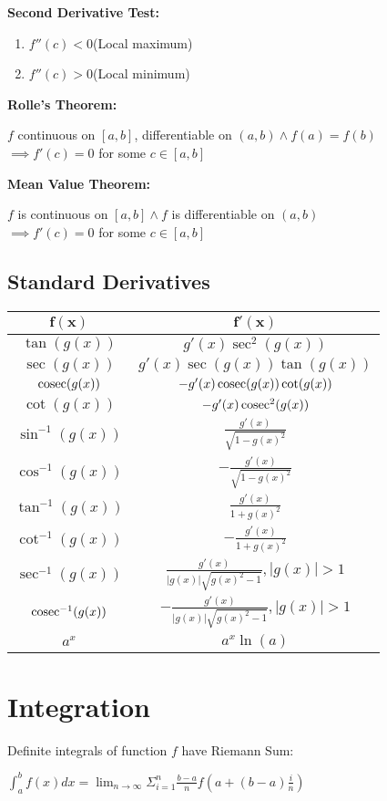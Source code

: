 \documentclass[12pt, a4paper]{article}
\begin{document}
\begin{multicols*}{3}
\textbf{Second Derivative Test:}
\begin{enumerate}[\roman*.]
  \item $f''(c)<0$\hfill(Local maximum)
  \item $f''(c)>0$\hfill(Local minimum)
\end{enumerate}

\textbf{Rolle's Theorem:}\\
{\centering
  $f$ continuous on $[a,b]$, differentiable on $(a,b) \land f(a) = f(b)$\\
  $\implies f'(c) = 0$ for some $c \in [a,b]$
\par}

\textbf{Mean Value Theorem:}\\
{\centering
  $f$ is continuous on $[a,b] \land f$ is differentiable on $(a,b)$\\
  $\implies f'(c) = 0$ for some $c \in [a,b]$
\par}

\subsection{Standard Derivatives}
{\centering
\begin{tabular}{|c|c|}
\hline
$\mathbf{f(x)}$ & $\mathbf{f'(x)}$ \\ \hline
$\tan(g(x))$ & $g'(x)\sec^2(g(x))$ \\ \hline
$\sec(g(x))$ & $g'(x)\sec(g(x))\tan(g(x))$ \\ \hline
$\operatorname{cosec}(g(x))$ & $-g'(x)\operatorname{cosec}(g(x))\cot(g(x))$ \\ \hline
$\cot(g(x))$ & $-g'(x)\operatorname{cosec}^2(g(x))$ \\ \hline
$\sin^{-1}(g(x))$ & $\frac{g'(x)}{\sqrt{1-g(x)^2}}$ \\ \hline
$\cos^{-1}(g(x))$ & $-\frac{g'(x)}{\sqrt{1-g(x)^2}}$ \\ \hline
$\tan^{-1}(g(x))$ & $\frac{g'(x)}{1+g(x)^2}$ \\ \hline
$\cot^{-1}(g(x))$ & $-\frac{g'(x)}{1+g(x)^2}$ \\ \hline
$\sec^{-1}(g(x))$ & $\frac{g'(x)}{|g(x)|\sqrt{g(x)^2 - 1}}, |g(x)|>1$ \\ \hline
$\operatorname{cosec}^{-1}(g(x))$ & $-\frac{g'(x)}{|g(x)|\sqrt{g(x)^2 - 1}}, |g(x)|>1$ \\ \hline
$a^x$ & $a^x\ln(a)$ \\ \hline
\end{tabular}
\par}
\section{Integration}
Definite integrals of function $f$ have Riemann Sum:\\
{\centering
  $\displaystyle \int^b_a f(x)dx = \lim_{n\rightarrow\infty}\Sigma^n_{i=1} \frac{b-a}{n}f\left(a+(b-a)\frac{i}{n}\right)$
\par}


\end{multicols*}
\end{document}
